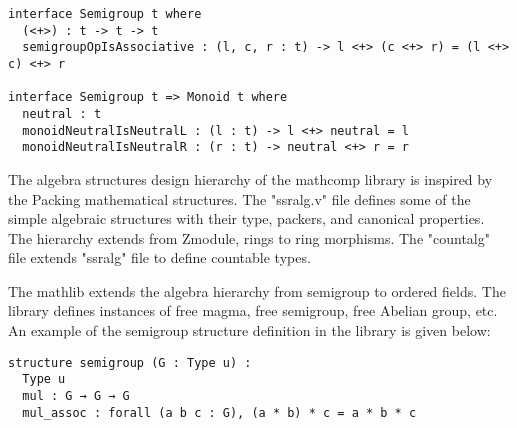 \begin{verbatim}
interface Semigroup t where
  (<+>) : t -> t -> t
  semigroupOpIsAssociative : (l, c, r : t) -> l <+> (c <+> r) = (l <+> c) <+> r

interface Semigroup t => Monoid t where
  neutral : t
  monoidNeutralIsNeutralL : (l : t) -> l <+> neutral = l
  monoidNeutralIsNeutralR : (r : t) -> neutral <+> r = r
\end{verbatim}

The algebra structures design hierarchy of the mathcomp library is inspired by
the Packing mathematical structures. The "ssralg.v" file defines some of the
simple algebraic structures with their type, packers, and canonical properties.
The hierarchy extends from Zmodule, rings to ring morphisms. The "countalg" file
extends "ssralg" file to define countable types.

The mathlib extends the algebra hierarchy from semigroup to ordered fields. The
library defines instances of free magma, free semigroup, free Abelian group,
etc. An example of the semigroup structure definition in the library is given below:

\begin{verbatim}
structure semigroup (G : Type u) :
  Type u  
  mul : G → G → G 
  mul_assoc : forall (a b c : G), (a * b) * c = a * b * c
\end{verbatim}

